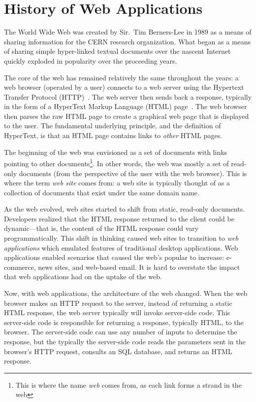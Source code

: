 \section{History of Web Applications}

The World Wide Web was created by Sir.\ Tim Berners-Lee in 1989 as a
means of sharing information for the CERN research organization. What
began as a means of sharing simple hyper-linked textual documents over
the nascent Internet quickly exploded in popularity over the
proceeding years.

The core of the web has remained relatively the same throughout the
years: a web browser (operated by a user) connects to a web server
using the Hypertext Transfer Protocol (HTTP)~\cite{fielding99:http11}.
The web server then sends back a response, typically in the form of a
HyperText Markup Language (HTML) page~\cite{berjon14:html5}. The web
browser then parses the raw HTML page to create a graphical web page that
is displayed to the user. The fundamental underlying principle, and
the definition of HyperText, is that an HTML page contains links to
\emph{other} HTML pages.

The beginning of the web was envisioned as a set of documents with
links pointing to other documents\footnote{This is where the name
  \emph{web} comes from, as each link forms a strand in the web}. In
other words, the web was mostly a set of read-only documents (from the
perspective of the user with the web browser). This is where the term
\emph{web site} comes from: a web site is typically thought of as a
collection of documents that exist under the same domain name.

As the web evolved, web sites started to shift from static, read-only
documents. Developers realized that the HTML response returned to the
client could be dynamic---that is, the content of the HTML response
could vary programmatically. This shift in thinking caused web sites to
transition to \emph{web applications} which emulated features of
traditional desktop applications. Web applications enabled scenarios
that caused the web's popular to increase: e-commerce, news sites, and
web-based email. It is hard to overstate the impact that web
applications had on the uptake of the web. 

Now, with web applications, the architecture of the web changed. When
the web browser makes an HTTP request to the server, instead of
returning a static HTML response, the web server typically will invoke
server-side code. This server-side code is responsible for returning a
response, typically HTML, to the browser. The server-side code can use
any number of inputs to determine the response, but the typically the
server-side code reads the parameters sent in the browser's HTTP
request, consults an SQL database, and returns an HTML response.

